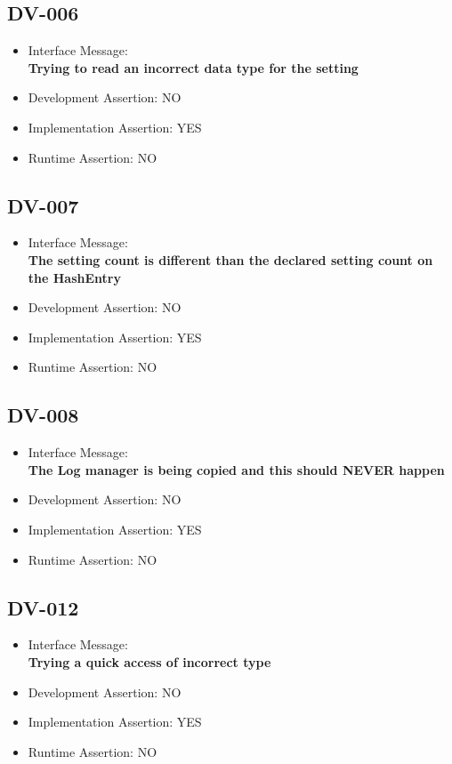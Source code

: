 \subsection{DV-006}
\begin{itemize}
  \item Interface Message:\\[1em]\textbf{Trying to read an incorrect data type for the setting}
  \item Development Assertion: NO
  \item Implementation Assertion: YES
  \item Runtime Assertion: NO
\end{itemize}

\subsection{DV-007}
\begin{itemize}
  \item Interface Message:\\[1em]\textbf{The setting count is different than the declared setting count on the HashEntry}
  \item Development Assertion: NO
  \item Implementation Assertion: YES
  \item Runtime Assertion: NO
\end{itemize}

\subsection{DV-008}
\begin{itemize}
  \item Interface Message:\\[1em]\textbf{The Log manager is being copied and this should NEVER happen}
  \item Development Assertion: NO
  \item Implementation Assertion: YES
  \item Runtime Assertion: NO
\end{itemize}

\subsection{DV-012}
\begin{itemize}
  \item Interface Message:\\[1em]\textbf{Trying a quick access of incorrect type}
  \item Development Assertion: NO
  \item Implementation Assertion: YES
  \item Runtime Assertion: NO
\end{itemize}

